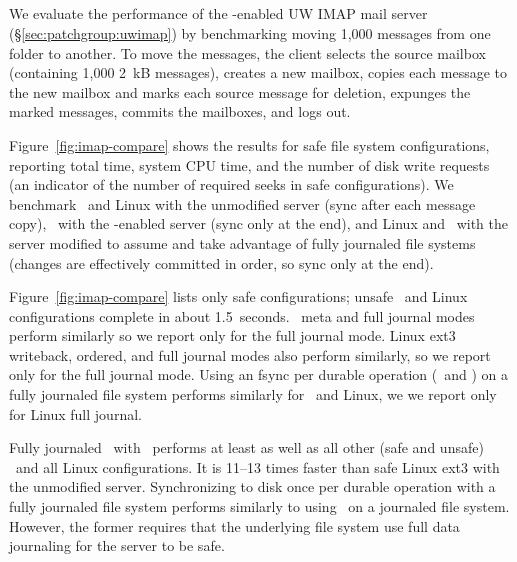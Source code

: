 \subsection {\Patchgroups}
\label{sec:evaluation:uwimap}


We evaluate the performance of the \patchgroup-enabled UW IMAP mail
server (\S\ref{sec:patchgroup:uwimap}) by benchmarking moving 1,000
messages from one folder to another.
%
To move the messages, the client selects the source mailbox (containing
1,000 2~kB messages), creates a new mailbox, copies each message to
the new mailbox and marks each source message for deletion, expunges
the marked messages, commits the mailboxes, and logs out.

Figure~\ref{fig:imap-compare} shows the results for safe file system
configurations,
%
reporting total time, system CPU time, and the number of disk write
requests (an indicator of the number of required seeks in safe
configurations).
%
We benchmark
%
\Kudos\ and Linux with the unmodified server (sync after each message
copy),
%
\Kudos\ with the \patchgroup-enabled server (sync only at the end),
%
and Linux and \Kudos\ with the server modified to assume and take
advantage of fully journaled file systems (changes are effectively
committed in order, so sync only at the end).

Figure~\ref{fig:imap-compare} lists only safe configurations; unsafe
\Kudos\ and Linux configurations complete in about 1.5~seconds.
%
\Kudos\ meta and full journal modes perform similarly so we report
only for the full journal mode.
%
Linux ext3 writeback, ordered, and full journal modes also perform similarly,
so we report only for the full journal mode.
%
Using an fsync per durable operation (\imapCheck\ and \imapExpunge) on
a fully journaled file system performs similarly for \Kudos\ and
Linux, we we report only for Linux full journal.

Fully journaled \Kudos\ with \patchgroups\ performs at least as well
as all other (safe and unsafe) \Kudos\ and all Linux configurations.
It is 11--13 times faster than safe Linux ext3 with the unmodified
server.
%
Synchronizing to disk once per durable operation with a fully
journaled file system performs similarly to using \patchgroups\ on a
journaled file system. However, the former requires that the
underlying file system use full data journaling for the server to be
safe.

